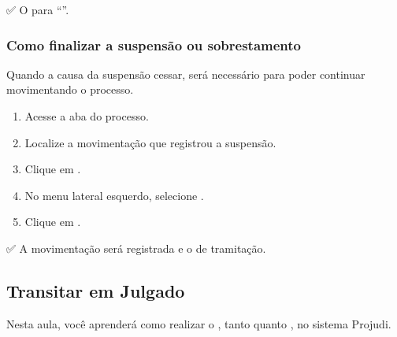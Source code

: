 \documentclass[letterpaper,10pt,brazil]{sphinxmanual}
\begin{document}
\sphinxAtStartPar
✅ O  para “”.


\subsubsection{Como finalizar a suspensão ou sobrestamento}
\label{\detokenize{projud_39_suspensaosobrestamento:como-finalizar-a-suspensao-ou-sobrestamento}}
\sphinxAtStartPar
Quando a causa da suspensão cessar, será necessário  para poder continuar movimentando o processo.
\begin{enumerate}
%
\item {} 
\sphinxAtStartPar
Acesse a aba  do processo.

\item {} 
\sphinxAtStartPar
Localize a movimentação que registrou a suspensão.

\item {} 
\sphinxAtStartPar
Clique em .

\item {} 
\sphinxAtStartPar
No menu lateral esquerdo, selecione .

\begin{sphinxVerbatim}[commandchars=\\\{\}]
\PYG{p}{[}  \PYG{p}{]}
  
\end{sphinxVerbatim}

\item {} 
\sphinxAtStartPar
Clique em .

\end{enumerate}

\sphinxAtStartPar
✅ A movimentação será registrada e o  de tramitação.

\sphinxstepscope


\subsection{Transitar em Julgado}
\label{\detokenize{projud_40_transitaremjulgado:transitar-em-julgado}}\label{\detokenize{projud_40_transitaremjulgado::doc}}
\sphinxAtStartPar
Nesta aula, você aprenderá como realizar o , tanto  quanto , no sistema Projudi.
\end{document}
